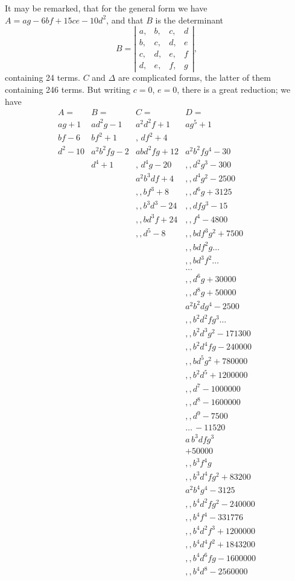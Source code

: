 \documentclass[11pt]{article}
\begin{document}
\medskip
It may be remarked, that for the general form we have
$A=ag-6bf+15ce-10d^{2}$, and that $B$ is the determinant
\[
  B=\left|\begin{array}{cccc}
    a, & b, & c, & d\\
    b, & c, & d, & e\\
    c, & d, & e, & f\\
    d, & e, & f, & g
  \end{array}\right|,
\]
containing 24 terms.  $C$ and $\Delta$ are complicated forms, the
latter of them containing 246 terms.  But writing $c=0$, $e=0$,
there is a great reduction; we have
\[
\begin{array}{llll}
A= & B= & C= & D=\\[2pt]
ag+1 & ad^{2}g-1 & a^{2}d^{2}f+1 & ag^{5}+1\\
bf-6 & bf^{2}+1 & ,\,df^{2}+4 & \\
d^{2}-10 & a^{2}b^{2}fg-2 & abd^{2}fg+12 & a^{2}b^{2}fg^{4}-30\\
 & d^{4}+1 & ,\,d^{4}g-20 & ,,d^{2}g^{3}-300\\
 & & a^{2}b^{3}df+4 & ,,d^{4}g^{2}-2500\\
 & & ,,bf^{3}+8 & ,,d^{6}g+3125\\
 & & ,,b^{3}d^{3}-24 & ,,dfg^{3}-15\\
 & & ,,bd^{3}f+24 & ,,f^{4}-4800\\
 & & ,,d^{5}-8 & ,,bdf^{3}g^{2}+7500\\
 & & & ,,bdf^{2}g\ldots\\
 & & & ,,bd^{3}f^{2}\ldots\\
 & & & \ldots\\
 & & & ,,d^{6}g+30000\\
 & & & ,,d^{8}g+50000\\
 & & & a^{2}b^{2}dg^{4}-2500\\
 & & & ,,b^{2}d^{2}fg^{3}\ldots\\
 & & & ,,b^{2}d^{3}g^{2}-171300\\
 & & & ,,b^{2}d^{4}fg-240000\\
 & & & ,,bd^{5}g^{2}+780000\\
 & & & ,,b^{2}d^{5}+1200000\\
 & & & ,,d^{7}-1000000\\
 & & & ,,d^{8}-1600000\\
 & & & ,,d^{9}-7500\\
 & & & \ldots\,-11520\\
 & & & a\,b^{3}dfg^{3}\\
 & & & +50000\\
 & & & ,,b^{3}f^{4}g\\
 & & & ,,b^{3}d^{4}fg^{2}+83200\\
 & & & a^{2}b^{4}g^{4}-3125\\
 & & & ,,b^{4}d^{2}fg^{2}-240000\\
 & & & ,,b^{4}f^{4}-331776\\
 & & & ,,b^{4}d^{2}f^{3}+1200000\\
 & & & ,,b^{4}d^{4}f^{2}+1843200\\
 & & & ,,b^{4}d^{6}fg-1600000\\
 & & & ,,b^{4}d^{8}-2560000
\end{array}
\]
\end{document}
